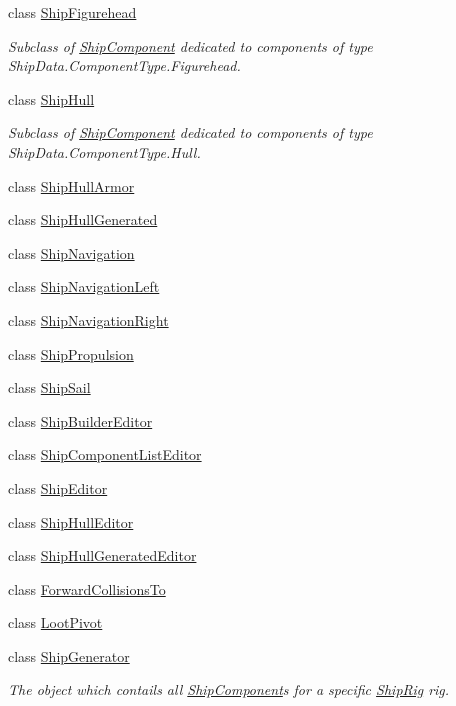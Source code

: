 \begin{DoxyCompactItemize}
class \hyperlink{class_skyrates_1_1_ship_1_1_ship_figurehead}{Ship\-Figurehead}
\begin{DoxyCompactList}\small\item\em Subclass of \hyperlink{class_skyrates_1_1_ship_1_1_ship_component}{Ship\-Component} dedicated to components of type Ship\-Data.\-Component\-Type.\-Figurehead. \end{DoxyCompactList}\item 
class \hyperlink{class_skyrates_1_1_ship_1_1_ship_hull}{Ship\-Hull}
\begin{DoxyCompactList}\small\item\em Subclass of \hyperlink{class_skyrates_1_1_ship_1_1_ship_component}{Ship\-Component} dedicated to components of type Ship\-Data.\-Component\-Type.\-Hull. \end{DoxyCompactList}\item 
class \hyperlink{class_skyrates_1_1_ship_1_1_ship_hull_armor}{Ship\-Hull\-Armor}
\item 
class \hyperlink{class_skyrates_1_1_ship_1_1_ship_hull_generated}{Ship\-Hull\-Generated}
\item 
class \hyperlink{class_skyrates_1_1_ship_1_1_ship_navigation}{Ship\-Navigation}
\item 
class \hyperlink{class_skyrates_1_1_ship_1_1_ship_navigation_left}{Ship\-Navigation\-Left}
\item 
class \hyperlink{class_skyrates_1_1_ship_1_1_ship_navigation_right}{Ship\-Navigation\-Right}
\item 
class \hyperlink{class_skyrates_1_1_ship_1_1_ship_propulsion}{Ship\-Propulsion}
\item 
class \hyperlink{class_skyrates_1_1_ship_1_1_ship_sail}{Ship\-Sail}
\item 
class \hyperlink{class_skyrates_1_1_ship_1_1_ship_builder_editor}{Ship\-Builder\-Editor}
\item 
class \hyperlink{class_skyrates_1_1_ship_1_1_ship_component_list_editor}{Ship\-Component\-List\-Editor}
\item 
class \hyperlink{class_skyrates_1_1_ship_1_1_ship_editor}{Ship\-Editor}
\item 
class \hyperlink{class_skyrates_1_1_ship_1_1_ship_hull_editor}{Ship\-Hull\-Editor}
\item 
class \hyperlink{class_skyrates_1_1_ship_1_1_ship_hull_generated_editor}{Ship\-Hull\-Generated\-Editor}
\item 
class \hyperlink{class_skyrates_1_1_ship_1_1_forward_collisions_to}{Forward\-Collisions\-To}
\item 
class \hyperlink{class_skyrates_1_1_ship_1_1_loot_pivot}{Loot\-Pivot}
\item 
class \hyperlink{class_skyrates_1_1_ship_1_1_ship_generator}{Ship\-Generator}
\begin{DoxyCompactList}\small\item\em The object which contails all \hyperlink{class_skyrates_1_1_ship_1_1_ship_component}{Ship\-Component}s for a specific \hyperlink{class_skyrates_1_1_ship_1_1_ship_rig}{Ship\-Rig} rig. \end{DoxyCompactList}\end{DoxyCompactItemize}
